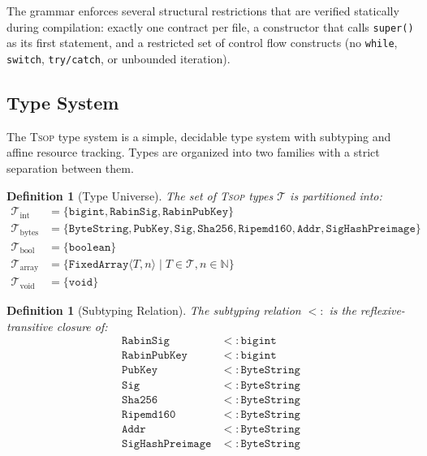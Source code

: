 \documentclass[11pt,a4paper]{article}
\newtheorem{definition}[theorem]{Definition}
\newcommand{\tsop}{\textsc{Tsop}}
\newcommand{\bs}{\texttt{ByteString}}
\newcommand{\bigintty}{\texttt{bigint}}
\newcommand{\boolty}{\texttt{boolean}}
\newcommand{\voidty}{\texttt{void}}
\newcommand{\subtype}{\mathrel{<:}}
\begin{document}
The grammar enforces several structural restrictions that are verified
statically during compilation: exactly one contract per file, a constructor
that calls \texttt{super()} as its first statement, and a restricted set of
control flow constructs (no \texttt{while}, \texttt{switch}, \texttt{try/catch},
or unbounded iteration).

\subsection{Type System}
\label{sec:types}

The \tsop{} type system is a simple, decidable type system with subtyping
and affine resource tracking. Types are organized into two families with a
strict separation between them.

\begin{definition}[Type Universe]
The set of \tsop{} types $\mathcal{T}$ is partitioned into:
\begin{align}
\mathcal{T}_{\mathrm{int}} &= \{ \bigintty, \texttt{RabinSig}, \texttt{RabinPubKey} \} \\
\mathcal{T}_{\mathrm{bytes}} &= \{ \bs, \texttt{PubKey}, \texttt{Sig}, \texttt{Sha256}, \texttt{Ripemd160}, \texttt{Addr}, \texttt{SigHashPreimage} \} \\
\mathcal{T}_{\mathrm{bool}} &= \{ \boolty \} \\
\mathcal{T}_{\mathrm{array}} &= \{ \texttt{FixedArray}\langle T, n \rangle \mid T \in \mathcal{T}, n \in \mathbb{N} \} \\
\mathcal{T}_{\mathrm{void}} &= \{ \voidty \}
\end{align}
\end{definition}

\begin{definition}[Subtyping Relation]
\label{def:subtyping}
The subtyping relation $\subtype$ is the reflexive-transitive closure of:
\begin{align}
\texttt{RabinSig} &\subtype \bigintty \\
\texttt{RabinPubKey} &\subtype \bigintty \\
\texttt{PubKey} &\subtype \bs \\
\texttt{Sig} &\subtype \bs \\
\texttt{Sha256} &\subtype \bs \\
\texttt{Ripemd160} &\subtype \bs \\
\texttt{Addr} &\subtype \bs \\
\texttt{SigHashPreimage} &\subtype \bs
\end{align}
\end{definition}
\end{document}
